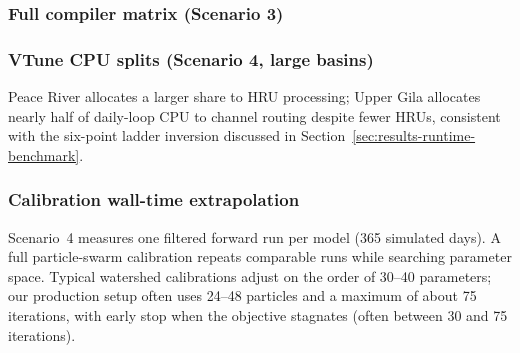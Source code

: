 \subsubsection{Full compiler matrix (Scenario 3)}
\label{sec:supp-runtime-compiler}

\begin{table}[htbp]
  \centering
  \caption{Supplementary Table~S2. Compiler optimization matrix on the filtered calibration print profile (365-day runs). ``Prod.'' marks the production ifx \texttt{-O3 -ipo} build used elsewhere.}
  \label{tab:supp-runtime-compiler}
  \scriptsize
  \setlength{\tabcolsep}{3pt}
  \renewcommand{\arraystretch}{1.05}
\end{table}

\subsubsection{VTune CPU splits (Scenario 4, large basins)}
\label{sec:supp-runtime-vtune}

\begin{table}[htbp]
  \centering
  \caption{Supplementary Table~S3. Intel VTune hotspot shares on filtered calibration runs (90 simulated days). Daily-loop percentages are shown for the repeating simulation phase; Init is reported separately.}
  \label{tab:supp-runtime-vtune}
  \scriptsize
  \setlength{\tabcolsep}{4pt}
  \renewcommand{\arraystretch}{1.08}
\end{table}

Peace River allocates a larger share to HRU processing; Upper Gila allocates nearly half of daily-loop CPU to channel routing despite fewer HRUs, consistent with the six-point ladder inversion discussed in Section~\ref{sec:results-runtime-benchmark}.

\subsubsection{Calibration wall-time extrapolation}
\label{sec:supp-runtime-calibration-cost}

Scenario~4 measures one filtered forward run per model (365 simulated days).
A full particle-swarm calibration repeats comparable runs while searching parameter space.
Typical watershed calibrations adjust on the order of 30--40 parameters; our production setup often uses 24--48 particles and a maximum of about 75 iterations, with early stop when the objective stagnates (often between 30 and 75 iterations).

